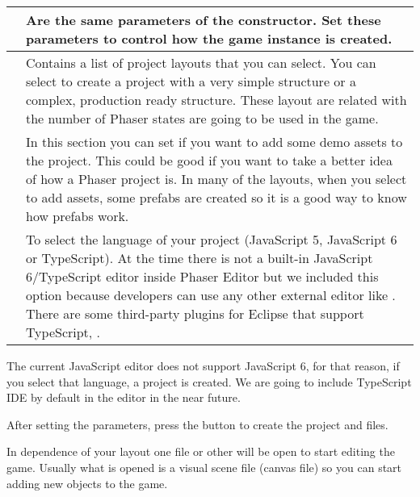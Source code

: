 \documentclass[letterpaper,10pt,english]{sphinxmanual}
\begin{document}
\begin{savenotes}\sphinxattablestart
\centering
\begin{tabulary}{\linewidth}[t]{|T|T|}
\hline

&
Are the same parameters of the  constructor.  Set these parameters to control how the game instance is created.
\\
\hline
{}
&
Contains a list of project layouts that you can select. You can select to create a project with a very simple structure or a complex, production ready structure. These layout are related with the number of Phaser states are going to be used in the game.
\\
\hline
{}
&
In this section you can set if you want to add some demo assets to the project. This could be good if you want to take a better idea of how a Phaser project is. In many of the layouts, when you select to add assets, some prefabs are created so it is a good way to know how prefabs work.
\\
\hline
{}
&
To select the language of your project (JavaScript 5, JavaScript 6 or TypeScript). At the time there is not a built-in JavaScript 6/TypeScript editor inside Phaser Editor but we included this option because developers can use any other external editor like . There are some third-party plugins for Eclipse that support TypeScript, .
\\
\hline
\end{tabulary}
\par
\sphinxattableend\end{savenotes}

The current JavaScript editor does not support JavaScript 6, for that reason, if you select that language, a  project is created. We are going to include TypeScript IDE by default in the editor in the near future.

After setting the parameters, press the  button to create the project and files.

In dependence of your layout one file or other will be open to start editing the game. Usually what is opened is a visual scene file (canvas file) so you can start adding new objects to the game.
\end{document}
